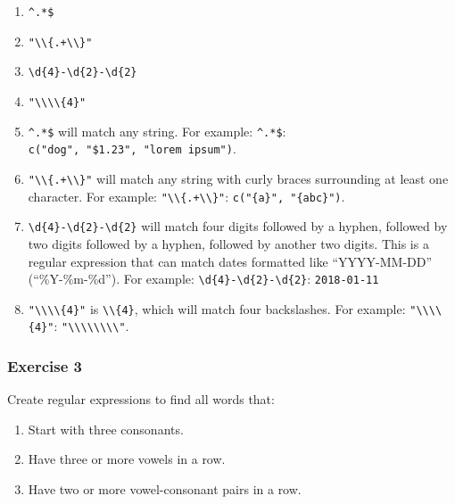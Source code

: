 \documentclass[]{book}
\providecommand{\tightlist}{%
  \setlength{\itemsep}{0pt}\setlength{\parskip}{0pt}}
\theoremstyle{plain}
\theoremstyle{remark}
\theoremstyle{definition}
\theoremstyle{definition}
\theoremstyle{definition}
\theoremstyle{remark}
\begin{document}
\begin{enumerate}
\def\labelenumi{\arabic{enumi}.}
\item
  \texttt{\^{}.*\$}
\item
  \texttt{"\textbackslash{}\textbackslash{}\{.+\textbackslash{}\textbackslash{}\}"}
\item
  \texttt{\textbackslash{}d\{4\}-\textbackslash{}d\{2\}-\textbackslash{}d\{2\}}
\item
  \texttt{"\textbackslash{}\textbackslash{}\textbackslash{}\textbackslash{}\{4\}"}
\item
  \texttt{\^{}.*\$} will match any string. For example:
  \texttt{\^{}.*\$}: \texttt{c("dog",\ "\$1.23",\ "lorem\ ipsum")}.
\item
  \texttt{"\textbackslash{}\textbackslash{}\{.+\textbackslash{}\textbackslash{}\}"}
  will match any string with curly braces surrounding at least one
  character. For example:
  \texttt{"\textbackslash{}\textbackslash{}\{.+\textbackslash{}\textbackslash{}\}"}:
  \texttt{c("\{a\}",\ "\{abc\}")}.
\item
  \texttt{\textbackslash{}d\{4\}-\textbackslash{}d\{2\}-\textbackslash{}d\{2\}}
  will match four digits followed by a hyphen, followed by two digits
  followed by a hyphen, followed by another two digits. This is a
  regular expression that can match dates formatted like ``YYYY-MM-DD''
  (``\%Y-\%m-\%d''). For example:
  \texttt{\textbackslash{}d\{4\}-\textbackslash{}d\{2\}-\textbackslash{}d\{2\}}:
  \texttt{2018-01-11}
\item
  \texttt{"\textbackslash{}\textbackslash{}\textbackslash{}\textbackslash{}\{4\}"}
  is \texttt{\textbackslash{}\textbackslash{}\{4\}}, which will match
  four backslashes. For example:
  \texttt{"\textbackslash{}\textbackslash{}\textbackslash{}\textbackslash{}\{4\}"}:
  \texttt{"\textbackslash{}\textbackslash{}\textbackslash{}\textbackslash{}\textbackslash{}\textbackslash{}\textbackslash{}\textbackslash{}"}.
\end{enumerate}

\hypertarget{exercise-3-30}{%
\subsubsection{Exercise 3}\label{exercise-3-30}}

Create regular expressions to find all words that:

\begin{enumerate}
\def\labelenumi{\arabic{enumi}.}
\tightlist
\item
  Start with three consonants.
\item
  Have three or more vowels in a row.
\item
  Have two or more vowel-consonant pairs in a row.
\end{enumerate}
\end{document}
